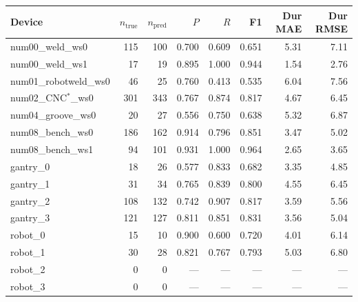 \documentclass[9pt,a4paper,twocolumn]{extarticle}
\begin{document}
\begin{center}\scriptsize\setlength{\tabcolsep}{2.6pt}
\begin{tabular}{lrrrrrrr}
\toprule
Device & $n_{\mathrm{true}}$ & $n_{\mathrm{pred}}$ & $P$ & $R$ & F1 & Dur MAE & Dur RMSE \\
\midrule

num00\_weld\_ws0 & 115 & 100 & 0.700 & 0.609 & 0.651 & 5.31 & 7.11 \\

num00\_weld\_ws1 & 17 & 19 & 0.895 & 1.000 & 0.944 & 1.54 & 2.76 \\

num01\_robotweld\_ws0 & 46 & 25 & 0.760 & 0.413 & 0.535 & 6.04 & 7.56 \\

num02\_CNC$^\ast$\_ws0 & 301 & 343 & 0.767 & 0.874 & 0.817 & 4.67 & 6.45 \\

num04\_groove\_ws0 & 20 & 27 & 0.556 & 0.750 & 0.638 & 5.32 & 6.87 \\

num08\_bench\_ws0 & 186 & 162 & 0.914 & 0.796 & 0.851 & 3.47 & 5.02 \\

num08\_bench\_ws1 & 94 & 101 & 0.931 & 1.000 & 0.964 & 2.65 & 3.65 \\

gantry\_0 & 18 & 26 & 0.577 & 0.833 & 0.682 & 3.35 & 4.85 \\

gantry\_1 & 31 & 34 & 0.765 & 0.839 & 0.800 & 4.55 & 6.45 \\

gantry\_2 & 108 & 132 & 0.742 & 0.907 & 0.817 & 3.59 & 5.56 \\

gantry\_3 & 121 & 127 & 0.811 & 0.851 & 0.831 & 3.56 & 5.04 \\

robot\_0 & 15 & 10 & 0.900 & 0.600 & 0.720 & 4.01 & 6.14 \\

robot\_1 & 30 & 28 & 0.821 & 0.767 & 0.793 & 5.03 & 6.80 \\

robot\_2 & 0 & 0 & --- & --- & --- & --- & --- \\

robot\_3 & 0 & 0 & --- & --- & --- & --- & --- \\

\bottomrule
\end{tabular}
\par{}
\end{center}
\end{document}
